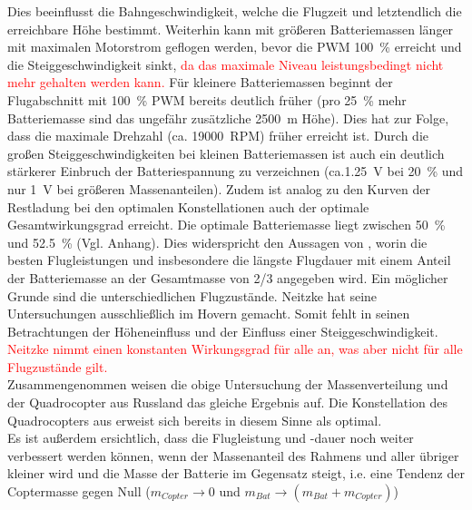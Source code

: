 Dies beeinflusst die Bahngeschwindigkeit, welche die Flugzeit und letztendlich die erreichbare Höhe bestimmt. Weiterhin kann mit größeren Batteriemassen länger mit maximalen Motorstrom geflogen werden, bevor die PWM \SI{100}{\%} erreicht und die Steiggeschwindigkeit sinkt, \textcolor{red}{da das maximale Niveau leistungsbedingt nicht mehr gehalten werden kann.} Für kleinere Batteriemassen beginnt der Flugabschnitt mit \SI{100}{\%} PWM bereits deutlich früher (pro \SI{25}{\%} mehr Batteriemasse sind das ungefähr zusätzliche \SI{2500}{m} Höhe). Dies hat zur Folge, dass die maximale Drehzahl (ca. \SI{19000}{RPM}) früher erreicht ist. Durch die großen Steiggeschwindigkeiten bei kleinen Batteriemassen ist auch ein deutlich stärkerer Einbruch der Batteriespannung zu verzeichnen (ca.\SI{1,25}{V} bei \SI{20}{\%} und nur \SI{1}{V} bei größeren Massenanteilen). Zudem ist analog zu den Kurven der Restladung bei den optimalen Konstellationen auch der optimale Gesamtwirkungsgrad erreicht. Die optimale Batteriemasse liegt zwischen \SI{50}{\%} und \SI{52.5}{\%} (Vgl. Anhang).
Dies widerspricht den Aussagen von \cite{Neitzke.2013}, worin die besten Flugleistungen und insbesondere die längste Flugdauer mit einem Anteil der Batteriemasse an der Gesamtmasse von 2/3 angegeben wird. Ein möglicher Grunde sind die unterschiedlichen Flugzustände. Neitzke hat seine Untersuchungen ausschließlich im Hovern gemacht. Somit fehlt in seinen Betrachtungen der Höheneinfluss und der Einfluss einer Steiggeschwindigkeit. \textcolor{red}{Neitzke nimmt einen konstanten Wirkungsgrad für alle an, was aber nicht für alle Flugzustände gilt.}\\
Zusammengenommen weisen die obige Untersuchung der Massenverteilung und der Quadrocopter aus Russland das gleiche Ergebnis auf. Die Konstellation des Quadrocopters aus \cite{Anderson.2018} erweist sich bereits in diesem Sinne als optimal.\\
Es ist außerdem ersichtlich, dass die Flugleistung und -dauer noch weiter verbessert werden können, wenn der Massenanteil des Rahmens und aller übriger kleiner wird und die Masse der Batterie im Gegensatz steigt, i.e. eine Tendenz der Coptermasse gegen Null (\ensuremath{m_{Copter}\rightarrow 0} und \ensuremath{m_{Bat}\rightarrow (m_{Bat}+m_{Copter})})



